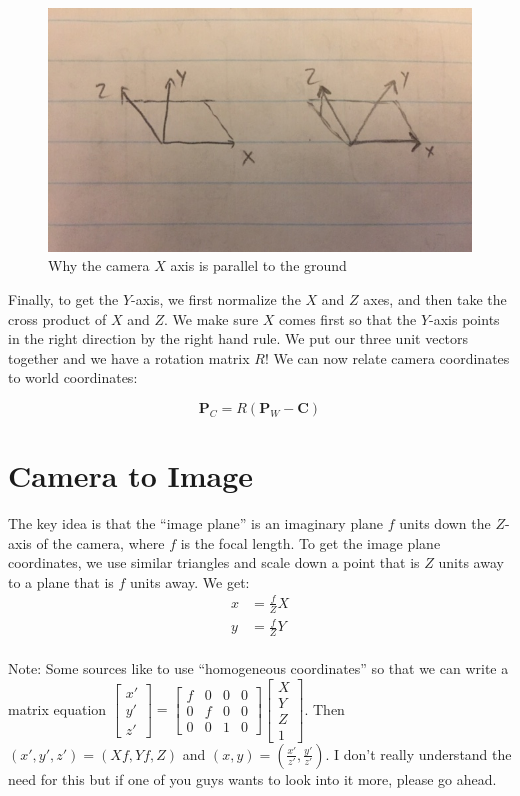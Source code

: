 \documentclass{article}
\begin{document}
\begin{figure}[H]
\includegraphics[scale=0.6]{Rotation_Diagram}
\centering
\caption{Why the camera $X$ axis is parallel to the ground}
\end{figure}

Finally, to get the $Y$-axis, we first normalize the $X$ and $Z$ axes, and then take the cross product of $X$ and $Z$. We make sure $X$ comes first so that the $Y$-axis points in the right direction by the right hand rule. We put our three unit vectors together and we have a rotation matrix $R$! We can now relate camera coordinates to world coordinates:

\[ \bm{P}_{C}=R(\bm{P}_{W}-\bm{C}) \]

\section{Camera to Image}
The key idea is that the ``image plane'' is an imaginary plane $f$ units down the $Z$-axis of the camera, where $f$ is the focal length. To get the image plane coordinates, we use similar triangles and scale down a point that is $Z$ units away to a plane that is $f$ units away. We get:
\begin{align*}
x&=\frac{f}{Z}X \\
y&=\frac{f}{Z}Y \\
\end{align*}

Note: Some sources like to use ``homogeneous coordinates'' so that we can write a matrix equation $\begin{bmatrix} x' \\ y' \\ z' \end{bmatrix}=\begin{bmatrix} f & 0 & 0 & 0 \\ 0 & f & 0 & 0 \\ 0 & 0 & 1 & 0 \end{bmatrix}\begin{bmatrix} X \\ Y \\ Z \\ 1 \end{bmatrix}$. Then $(x', y', z')=(Xf, Yf, Z)$ and $(x, y)=(\frac{x'}{z'}, \frac{y'}{z'})$. I don't really understand the need for this but if one of you guys wants to look into it more, please go ahead. \\
\end{document}
